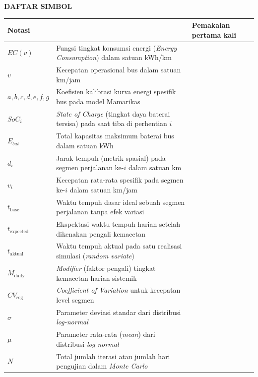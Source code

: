 \cleardoublepage
\vspace{2cm}
\begin{center}
{\fontsize{14}{16.8}\selectfont\textbf{DAFTAR SIMBOL}}\\[1em]
\end{center}
\label{chap:simbol}
\setcounter{chapter}{0}
\setcounter{section}{0}
\vspace{2em}




\begin{longtable}{@{} l >{\raggedright\arraybackslash}p{6.5cm} c @{}}
\multicolumn{1}{l}{\textbf{Notasi}} & \multicolumn{1}{l}{\textbf{Deskripsi}} & \multicolumn{1}{l}{\parbox[c]{3.5cm}{\centering\textbf{Pemakaian pertama kali}}} \\
\midrule

$EC(v)$ & Fungsi tingkat konsumsi energi (\textit{Energy Consumption}) dalam satuan kWh/km & \pageref{eq:ec-mamarikas} \\
$v$ & Kecepatan operasional bus dalam satuan km/jam & \pageref{eq:ec-mamarikas} \\
$a, b, c, d, e, f, g$ & Koefisien kalibrasi kurva energi spesifik bus pada model Mamarikas & \pageref{eq:ec-mamarikas} \\
$SoC_i$ & \textit{State of Charge} (tingkat daya baterai tersisa) pada saat tiba di perhentian $i$ & \pageref{eq:soc-update} \\
$E_{bat}$ & Total kapasitas maksimum baterai bus dalam satuan kWh & \pageref{eq:soc-update} \\
$d_i$ & Jarak tempuh (metrik spasial) pada segmen perjalanan ke-$i$ dalam satuan km & \pageref{eq:soc-update} \\
$v_i$ & Kecepatan rata-rata spesifik pada segmen ke-$i$ dalam satuan km/jam & \pageref{eq:soc-update} \\[1ex]

$t_{\text{base}}$ & Waktu tempuh dasar ideal sebuah segmen perjalanan tanpa efek variasi & \pageref{eq:lognormal-time} \\
$t_{\text{expected}}$ & Ekspektasi waktu tempuh harian setelah dikenakan pengali kemacetan & \pageref{eq:lognormal-time} \\
$t_{\text{aktual}}$ & Waktu tempuh aktual pada satu realisasi simulasi (\textit{random variate}) & \pageref{eq:lognormal-time} \\
$M_{\text{daily}}$ & \textit{Modifier} (faktor pengali) tingkat kemacetan harian sistemik & \pageref{eq:lognormal-time} \\
$CV_{\text{seg}}$ & \textit{Coefficient of Variation} untuk kecepatan level segmen & \pageref{eq:lognormal-time} \\
$\sigma$ & Parameter deviasi standar dari distribusi \textit{log-normal} & \pageref{eq:lognormal-time} \\
$\mu$ & Parameter rata-rata (\textit{mean}) dari distribusi \textit{log-normal} & \pageref{eq:lognormal-time} \\
$N$ & Total jumlah iterasi atau jumlah hari pengujian dalam \textit{Monte Carlo} & \pageref{alg:monte-carlo} \\[1ex]


\end{longtable}
